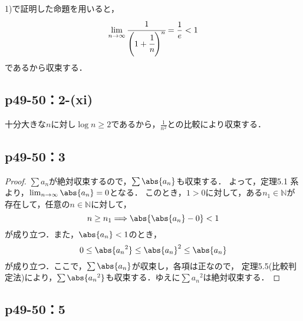 \documentclass[a4paper,10pt,fleqn]{ltjsarticle}
\begin{document}

    \begin{screen}
    1)で証明した命題を用いると，
    \[
      \lim _{n \to \infty} \cfrac{1}{\Bigg(1+\cfrac{1}{n}\Bigg)^n} = \frac{1}{e} < 1
    \]
    であるから収束する．
\end{screen}


\subsection*{p49-50：2-(xi)}


\begin{screen}
十分大きな$n$に対し$\log n \geq 2$であるから，$\frac{1}{n^2}$との比較により収束する．
\end{screen}

\newpage 

    \subsection*{p49-50：3}

    \begin{tleftbar}
        \begin{proof}
            $\sum a_n $が絶対収束するので，$\sum \abs{a_n}$も収束する．
            よって，定理5.1 系より，$\lim_{n \to \infty} \abs{a_n} =0$となる．
            このとき，$1>0$に対して，ある$n_1 \in \mathbb{N}$が存在して，任意の$n \in \mathbb{N}$に対して，
            \[
                n \ge n_1 \Longrightarrow \abs{\abs{a_n} -0}<1
            \]
            が成り立つ．また，$\abs{a_n}<1$のとき，
            \[
                0 \le \abs{{a_n}^2} \le {\abs{a_n}}^2 \le \abs{a_n}
            \]
            が成り立つ．ここで，$\sum \abs{a_n}$が収束し，各項は正なので， 定理5.5(比較判定法)により，$\sum \abs{{a_n}^2}$も収束する．ゆえに$\sum {a_n}^2$は絶対収束する．
        \end{proof}
    \end{tleftbar}


    \subsection*{p49-50：5}
\end{document}
